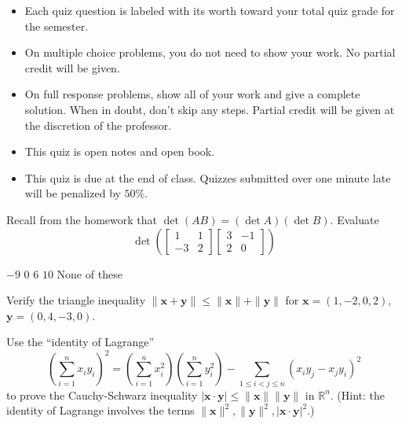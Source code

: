 \documentclass[12pt]{exam}
\newcommand{\vect}[1]{\ensuremath{\mathbf{#1}}}
\newcommand{\<}{(}
\renewcommand{\>}{)}
\begin{document}
\begin{center}
\end{center}
\vspace{0.1in}

\vspace{12pt}

\begin{itemize}
  \item Each quiz question is labeled with its worth toward your total quiz
        grade for the semester.
  \item On multiple choice problems, you do not need to show your work. No
        partial credit will be given.
  \item On full response problems, show all of your work and give a
        complete solution. When in doubt, don't skip any steps. Partial
        credit will be given at the discretion of the professor.
  \item This quiz is open notes and open book.
  \item This quiz is due at the end of class. Quizzes submitted over one minute
        late will be penalized by \(50\%\).
\end{itemize}

\newpage

\begin{questions}

\question[10]
Recall from the homework that \(\det(AB)=(\det A)(\det B)\).
Evaluate
\[
  \det\left(
    \left[
    \begin{matrix}
       1 &  1 \\
      -3 &  2
    \end{matrix}
    \right]
    \left[
    \begin{matrix}
       3 & -1 \\
       2 &  0
    \end{matrix}
    \right]
  \right)
\]


\begin{checkboxes}
\choice \(-9\)
\choice \(0\)
\choice \(6\)
\choice \(10\)
\choice None of these
\end{checkboxes}

\question[10]
Verify the triangle inequality
\(\|\vect x+\vect y\|\leq\|\vect x\|+\|\vect y\|\)
for \(\vect x=\<1,-2,0,2\>,\) \(\vect y=\<0,4,-3,0\>\).

\vfill
\newpage

\question[10]
Use the ``identity of Lagrange''
  \[
    \left(\sum_{i=1}^n x_iy_i\right)^2
      =
    \left(\sum_{i=1}^n x_i^2\right)
    \left(\sum_{i=1}^n y_i^2\right)
      -
    \sum_{1\leq i<j\leq n}
    \left(x_iy_j-x_jy_i \right)^2
  \]
to prove the Cauchy-Schwarz inequality
\(|\vect x\cdot\vect y|\leq\|\vect x\|\|\vect y\|\) in \(\mathbb R^n\).
(Hint: the identity of Lagrange involves the terms
\(\|\vect x\|^2,\|\vect y\|^2,|\vect x\cdot\vect y|^2\).)
\vfill
\end{questions}
\end{document}
